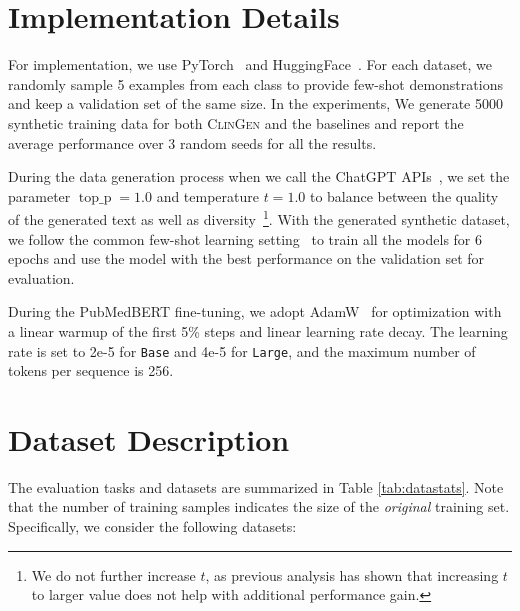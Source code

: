 \documentclass{article} %
\newcommand{\ours}{\textsc{ClinGen}\xspace}
\begin{document}
\section{Implementation Details}
\label{sec:implementation_details}
For implementation, we use PyTorch~\citep{paszke2019pytorch} and HuggingFace~\citep{wolf2019huggingface}. For each dataset, we randomly sample 5 examples from each class to provide few-shot demonstrations and keep a validation set of the same size. In the experiments, We generate 5000 synthetic training data for both {\ours} and the baselines and report the average performance over 3 random seeds for all the results.

During the data generation process when we call the ChatGPT APIs~\citep{chatgpt}, we set the parameter $\operatorname{top\_p}=1.0$ and temperature $t=1.0$ to balance between the quality of the generated text as well as diversity~\citep{chung2023increasing,yu2023large}\footnote{We do not further increase $t$, as previous analysis  \citep{chung2023increasing,yu2023large} has shown that increasing $t$ to larger value does not help with additional performance gain.}. 
With the generated synthetic dataset, we follow the common few-shot learning setting~\citep{perez2021true} to train all the models for 6 epochs and use the model with the best performance on the validation set for evaluation.

During the PubMedBERT fine-tuning, we adopt AdamW~\citep{loshchilov2017decoupled} for optimization with a linear warmup of the first 5\% steps and linear learning rate decay. The learning rate is set to 2e-5 for \texttt{Base} and 4e-5 for \texttt{Large}, and the maximum number of tokens per sequence is 256. 

\section{Dataset Description}
\label{sec:dataset_description}


The evaluation tasks and datasets are summarized in Table \ref{tab:datastats}. Note that the number of training samples indicates the size of the \textit{original} training set. Specifically, we consider the following datasets:
\end{document}
